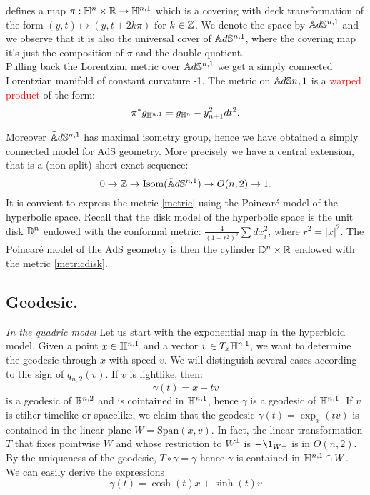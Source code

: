 defines a map $\pi:\mathbb{H}^n\times \mathbb{R}\to \mathbb{H}^{n,1}$ which is a covering with deck transformation of the form $(y,t)\mapsto (y,t+2k\pi)$ for $k\in \mathbb{Z}$. We denote the space by $\tilde{\mathbb{A}}d\mathbb{S}^{n,1}$ and we observe that it is also the universal cover of $\mathbb{A}d\mathbb{S}^{n,1}$, where the covering map it's just the composition of $\pi$ and the double quotient.\\
Pulling back the Lorentzian metric over $\tilde{\mathbb{A}}d\mathbb{S}^{n,1}$ we get a simply connected Lorentzian manifold of constant curvature -1. The metric on $\mathbb{A}d\mathbb{S}{n,1}$ is a \textcolor{red}{warped product} of the form: 
\begin{equation}\label{metric}
     \pi^*g_{\mathbb{H}^{n,1}}=g_{\mathbb{H}^n}-y_{n+1}^{2}dt^2.
\end{equation}
   

Moreover $\tilde{\mathbb{A}}d\mathbb{S}^{n,1}$ has maximal isometry group, hence we have obtained a simply connected model for AdS geometry. More precisely we have a central extension, that is a (non split) short exact sequence:
\[
    0\to \mathbb{Z}\to \textnormal{Isom}(\tilde{\mathbb{A}}d\mathbb{S}^{n,1})\to O(n,2)\to 1.
\]
It is convient to express the metric \ref{metric} using the Poincaré model of the hyperbolic space. Recall that the disk model of the hyperbolic space is the unit disk $\mathbb{D}^n$ endowed with the conformal metric: $\frac{4}{(1-r^2)^2}\sum dx_i^2$, where $r^2=\vert x\vert^2$. 
The Poincaré model of the AdS geometry is then the cylinder $\mathbb{D}^n\times \mathbb{R}$ endowed with the metric \ref{metricdisk}.\\
\subsection{Geodesic.}

\textit{In the quadric model} Let us start with the exponential map in the hyperbloid model. Given a point $x\in \mathbb{H}^{n,1}$ and a vector $v\in T_x\mathbb{H}^{n,1}$, we want to determine the geodesic through $x$ with speed $v$. We will distinguish several cases according to the sign of $ q_{n,2}(v)$. If $v$ is lightlike, then: 
\[
    \gamma(t)=x+tv
\] is a geodesic of $\mathbb{R}^{n,2}$ and is cointained in $\mathbb{H}^{n,1}$, hence $\gamma$ is a geodesic of $\mathbb{H}^{n,1}$. If $v$ is etiher timelike or spacelike, we claim that the geodesic $\gamma(t)=\exp_x(tv)$ is contained in the linear plane $W=\text{Span}(x,v).$ In fact, the linear transformation $T$ that fixes pointwise $W$ and whose restriction to $W^\perp$ is $-\1_{W^\perp}$ is in $O(n,2)$. By the uniqueness of the geodesic, $T\circ\gamma=\gamma$ hence $\gamma$ is contained in $\mathbb{H}^{n,1}\cap W$. We can easily derive the expressions\\
\begin{equation}
    \gamma(t)=\cosh(t)x+\sinh(t)v
\end{equation}

